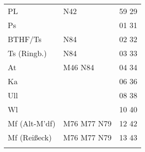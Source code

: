\begin{tabular}{!{\color{schiefergrau}\vrule width 3pt}*{3}{l!{\color{schiefergrau}\vrule width 3pt}}}
PL           & \nbus{} N42                         & 59 29 \\
Ps           &                                     & 01 31 \\
BTHF/Ts      & \nbus{} N84                         & 02 32 \\
Ts (Ringb.)  & \nbus{} N84                         & 03 33 \\
At           & \mbus{} M46 \nbus{} N84             & 04 34 \\
Ka           &                                     & 06 36 \\
Ull          &                                     & 08 38 \\
Wl           &                                     & 10 40 \\
Mf (Alt-M'df)& \mbus{} M76 M77 \nbus{} N79         & 12 42 \\
Mf (Reißeck) & \mbus{} M76 M77 \nbus{} N79         & 13 43 \\
\myhline
\end{tabular}
%
